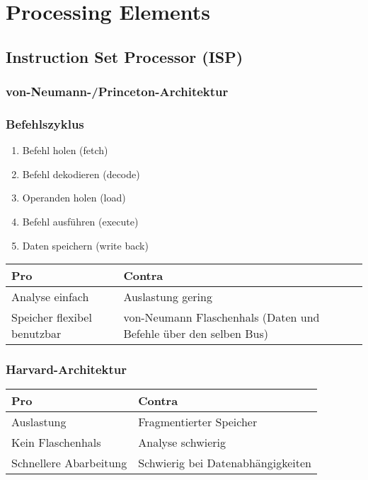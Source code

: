 \chapter{Processing Elements}
\section{Instruction Set Processor (ISP)}
\subsection{von-Neumann-/Princeton-Architektur}
\subsection{Befehlszyklus}
\begin{enumerate}
    \item Befehl holen (fetch)
    \item Befehl dekodieren (decode)
    \item Operanden holen (load)
    \item Befehl ausführen (execute)
    \item Daten speichern (write back)
\end{enumerate}

\begin{table}[H]
    \centering
    \begin{tabular}{p{}p{}}
        \toprule
        Pro & Contra \\
        \midrule
        Analyse einfach & Auslastung gering \\
        Speicher flexibel benutzbar & von-Neumann Flaschenhals (Daten und Befehle über den selben Bus)\\
        \bottomrule
    \end{tabular}
\end{table}

\subsection{Harvard-Architektur}
\begin{table}[H]
    \centering
    \begin{tabular}{p{}p{}}
        \toprule
        Pro & Contra \\
        \midrule
        Auslastung & Fragmentierter Speicher \\
        Kein Flaschenhals & Analyse schwierig \\
        Schnellere Abarbeitung & Schwierig bei Datenabhängigkeiten \\
        \bottomrule
    \end{tabular}
\end{table}

